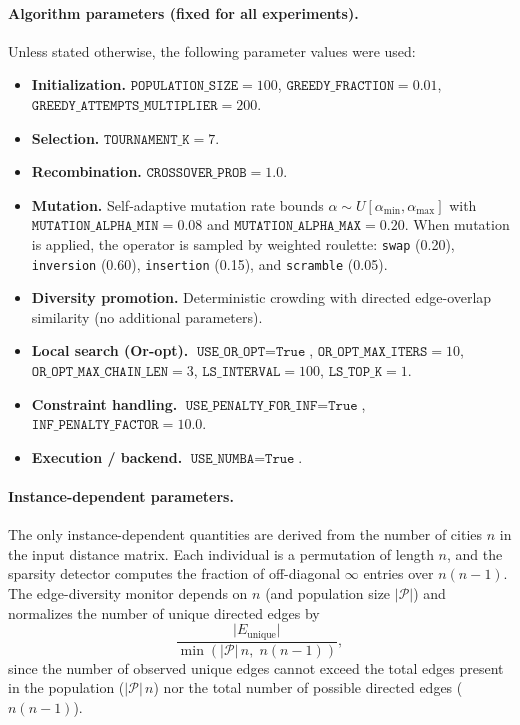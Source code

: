 \documentclass[a4paper,10pt]{article}
\begin{document}
\paragraph{Algorithm parameters (fixed for all experiments).}
Unless stated otherwise, the following parameter values were used:
\begin{itemize}
  \item \textbf{Initialization.}
  $\texttt{POPULATION\_SIZE}=100$, $\texttt{GREEDY\_FRACTION}=0.01$,
  $\texttt{GREEDY\_ATTEMPTS\_MULTIPLIER}=200$.

  \item \textbf{Selection.}
  $\texttt{TOURNAMENT\_K}=7$.

  \item \textbf{Recombination.}
  $\texttt{CROSSOVER\_PROB}=1.0$.

  \item \textbf{Mutation.}
  Self-adaptive mutation rate bounds $\alpha \sim U[\alpha_{\min},\alpha_{\max}]$ with
  $\texttt{MUTATION\_ALPHA\_MIN}=0.08$ and $\texttt{MUTATION\_ALPHA\_MAX}=0.20$. When mutation is applied, the
  operator is sampled by weighted roulette: \texttt{swap} (0.20), \texttt{inversion} (0.60), \texttt{insertion}
  (0.15), and \texttt{scramble} (0.05).

  \item \textbf{Diversity promotion.}
  Deterministic crowding with directed edge-overlap similarity (no additional parameters).

  \item \textbf{Local search (Or-opt).}
  $\texttt{USE\_OR\_OPT}=\texttt{True}$,
  $\texttt{OR\_OPT\_MAX\_ITERS}=10$,
  $\texttt{OR\_OPT\_MAX\_CHAIN\_LEN}=3$,
  $\texttt{LS\_INTERVAL}=100$,
  $\texttt{LS\_TOP\_K}=1$.

  \item \textbf{Constraint handling.}
  $\texttt{USE\_PENALTY\_FOR\_INF}=\texttt{True}$,
  $\texttt{INF\_PENALTY\_FACTOR}=10.0$.

  \item \textbf{Execution / backend.}
  $\texttt{USE\_NUMBA}=\texttt{True}$.
\end{itemize}

\paragraph{Instance-dependent parameters.}
The only instance-dependent quantities are derived from the number of cities $n$ in the input distance matrix.
Each individual is a permutation of length $n$, and the sparsity detector computes the fraction of off-diagonal
$\infty$ entries over $n(n-1)$. The edge-diversity monitor depends on $n$ (and population size $|\mathcal{P}|$)
and normalizes the number of unique directed edges by
\[
\frac{\lvert E_{\text{unique}}\rvert}{\min(|\mathcal{P}|\,n,\; n(n-1))},
\]
since the number of observed unique edges cannot exceed the total edges present in the population
($|\mathcal{P}|\,n$) nor the total number of possible directed edges ($n(n-1)$).
\end{document}
